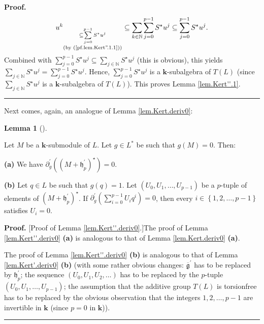 \documentclass[numbers=enddot,12pt,final,onecolumn,notitlepage]{scrartcl}%
\theoremstyle{definition}
\newtheorem{lem}[theo]{Lemma}
\newenvironment{lemma}[1][]
{\begin{lem}[#1]\begin{leftbar}}
{\end{leftbar}\end{lem}}
\newenvironment{proof}[1][Proof]{\noindent\textbf{#1.} }{\ \rule{0.5em}{0.5em}}
\let\sumnonlimits\sum
\renewcommand{\sum}{\sumnonlimits\limits}
\begin{document}
\begin{proof}
\[{{}u^{k}}_{\substack{\subseteq\sum_{j=0}^{p-1}S^{\star}u^{j}\\\text{(by
(\ref{pf.lem.Kert''.1.1}))}}}\subseteq\sum_{k\in\mathbb{N}}\sum_{j=0}%
^{p-1}S^{\star}u^{j}\subseteq\sum_{j=0}^{p-1}S^{\star}u^{j}.
\]
Combined with $\sum_{j=0}^{p-1}S^{\star}u^{j}\subseteq\sum_{j\in\mathbb{N}%
}S^{\star}u^{j}$ (this is obvious), this yields $\sum_{j\in\mathbb{N}}%
S^{\star}u^{j}=\sum_{j=0}^{p-1}S^{\star}u^{j}$. Hence, $\sum_{j=0}%
^{p-1}S^{\star}u^{j}$ is a $\mathbf{k}$-subalgebra of $T\left(  L\right)  $
(since $\sum_{j\in\mathbb{N}}S^{\star}u^{j}$ is a $\mathbf{k}$-subalgebra of
$T\left(  L\right)  $). This proves Lemma \ref{lem.Kert''.1}.
\end{proof}

Next comes, again, an analogue of Lemma \ref{lem.Kert.deriv0}:

\begin{lemma}
\label{lem.Kert''.deriv0}Let $M$ be a $\mathbf{k}$-submodule of $L$. Let $g\in
L^{\ast}$ be such that $g\left(  M\right)  =0$. Then: \medskip

\textbf{(a)} We have $\partial_{g}^{\prime}\left(  \left(  M+\mathfrak{h}%
_{p}^{\prime}\right)  ^{\star}\right)  =0$. \medskip

\textbf{(b)} Let $q\in L$ be such that $g\left(  q\right)  =1$. Let $\left(
U_{0},U_{1},\ldots,U_{p-1}\right)  $ be a $p$-tuple of elements of $\left(
M+\mathfrak{h}_{p}^{\prime}\right)  ^{\star}$. If $\partial_{g}^{\prime
}\left(  \sum_{i=0}^{p-1}U_{i}q^{i}\right)  =0$, then every $i\in\left\{
1,2,\ldots,p-1\right\}  $ satisfies $U_{i}=0$.
\end{lemma}

\begin{proof}
[Proof of Lemma \ref{lem.Kert''.deriv0}.]The proof of Lemma
\ref{lem.Kert''.deriv0} \textbf{(a)} is analogous to that of Lemma
\ref{lem.Kert.deriv0} \textbf{(a)}. \medskip

The proof of Lemma \ref{lem.Kert''.deriv0} \textbf{(b)} is analogous to that
of Lemma \ref{lem.Kert'.deriv0} \textbf{(b)} (with some rather obvious
changes: $\overline{\mathfrak{g}}^{\prime}$ has to be replaced by
$\mathfrak{h}_{p}^{\prime}$; the sequence $\left(  U_{0},U_{1},U_{2}%
,\ldots\right)  $ has to be replaced by the $p$-tuple $\left(  U_{0}%
,U_{1},\ldots,U_{p-1}\right)  $; the assumption that the additive group
$T\left(  L\right)  $ is torsionfree has to be replaced by the obvious
observation that the integers $1,2,\ldots,p-1$ are invertible in $\mathbf{k}$
(since $p=0$ in $\mathbf{k}$)).
\end{proof}
\end{document}
